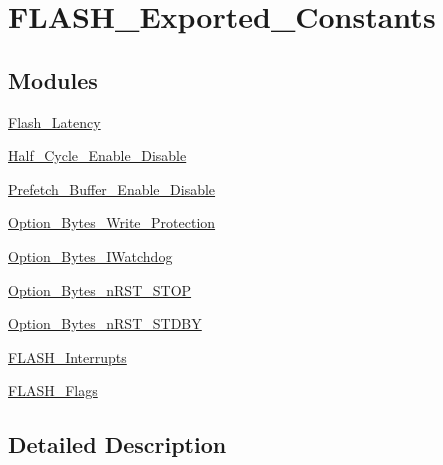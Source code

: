 \hypertarget{group___f_l_a_s_h___exported___constants}{}\section{F\+L\+A\+S\+H\+\_\+\+Exported\+\_\+\+Constants}
\label{group___f_l_a_s_h___exported___constants}
\subsection*{Modules}
\begin{DoxyCompactItemize}
\item 
\mbox{\hyperlink{group___flash___latency}{Flash\+\_\+\+Latency}}
\item 
\mbox{\hyperlink{group___half___cycle___enable___disable}{Half\+\_\+\+Cycle\+\_\+\+Enable\+\_\+\+Disable}}
\item 
\mbox{\hyperlink{group___prefetch___buffer___enable___disable}{Prefetch\+\_\+\+Buffer\+\_\+\+Enable\+\_\+\+Disable}}
\item 
\mbox{\hyperlink{group___option___bytes___write___protection}{Option\+\_\+\+Bytes\+\_\+\+Write\+\_\+\+Protection}}
\item 
\mbox{\hyperlink{group___option___bytes___i_watchdog}{Option\+\_\+\+Bytes\+\_\+\+I\+Watchdog}}
\item 
\mbox{\hyperlink{group___option___bytes__n_r_s_t___s_t_o_p}{Option\+\_\+\+Bytes\+\_\+n\+R\+S\+T\+\_\+\+S\+T\+OP}}
\item 
\mbox{\hyperlink{group___option___bytes__n_r_s_t___s_t_d_b_y}{Option\+\_\+\+Bytes\+\_\+n\+R\+S\+T\+\_\+\+S\+T\+D\+BY}}
\item 
\mbox{\hyperlink{group___f_l_a_s_h___interrupts}{F\+L\+A\+S\+H\+\_\+\+Interrupts}}
\item 
\mbox{\hyperlink{group___f_l_a_s_h___flags}{F\+L\+A\+S\+H\+\_\+\+Flags}}
\end{DoxyCompactItemize}


\subsection{Detailed Description}
